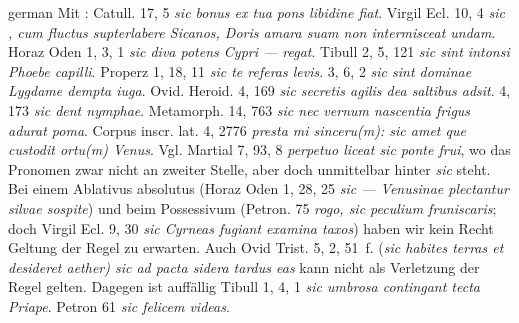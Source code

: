 \begin{otherlanguage*}{german}
Mit \emph{}: Catull. 17, 5 \emph{sic  bonus ex tua pons libidine fiat}. Virgil Ecl. 10, 4 \emph{sic , cum fluctus supterlabere Sicanos, Doris amara suam non intermisceat undam}. Horaz Oden 1, 3, 1 \emph{sic  diva potens Cypri — regat}. Tibull 2, 5, 121 \emph{sic  sint intonsi Phoebe capilli}. Properz 1, 18, 11 \emph{sic  te referas levis}. 3, 6, 2 \emph{sic  sint dominae Lygdame dempta iuga}. Ovid. Heroid. 4, 169 \emph{sic  secretis agilis dea saltibus adsit}. 4, 173 \emph{sic  dent nymphae}. Metamorph. 14, 763 \emph{sic  nec vernum nascentia frigus adurat poma}. Corpus inscr. lat. 4, 2776 \emph{presta mi sinceru(m): sic  amet que custodit ortu(m) Venus}. Vgl. Martial 7, 93, 8 \emph{perpetuo liceat sic  ponte frui}, wo das Pronomen zwar nicht an zweiter Stelle, aber doch unmittelbar hinter \emph{sic} steht. Bei einem Ablativus absolutus (Horaz Oden 1, 28, 25 \emph{sic — Venusinae plectantur silvae  sospite}) und beim Possessivum (Petron. 75 \emph{rogo, sic peculium  fruniscaris}; doch Virgil Ecl. 9, 30 \emph{sic  Cyrneas fugiant examina taxos}) haben wir kein Recht Geltung der Regel zu erwarten. Auch Ovid Trist. 5, 2, 51~f. (\emph{sic habites terras et  desideret aether) sic ad pacta  sidera tardus eas} kann nicht als Verletzung der Regel gelten. Dagegen ist auffällig Tibull 1, 4, 1 \emph{sic umbrosa  contingant tecta Priape}. Petron 61 \emph{sic felicem  videas}.


\end{otherlanguage*}
